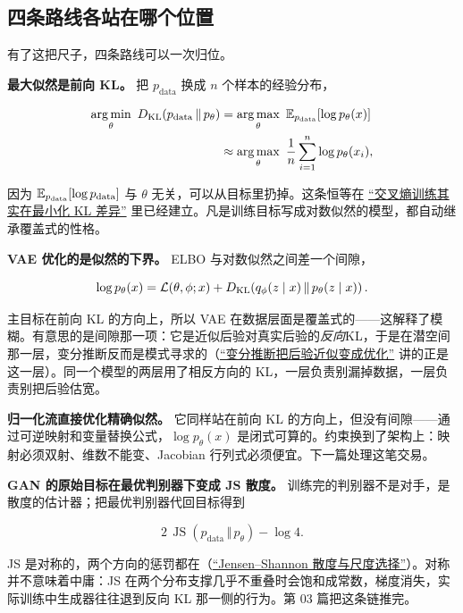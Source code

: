 \subsection{四条路线各站在哪个位置}

有了这把尺子，四条路线可以一次归位。

\textbf{最大似然是前向 KL。} 把 \(p_{\text{data}}\) 换成 \(n\) 个样本的经验分布，

\[
\begin{aligned}
\operatorname*{arg\,min}_\theta\ D_{\mathrm{KL}}(p_{\text{data}}\,\Vert\,p_\theta)
&=\operatorname*{arg\,max}_\theta\ \mathbb{E}_{p_{\text{data}}}\!\left[\log p_\theta(x)\right]\\
&\approx\operatorname*{arg\,max}_\theta\ \frac1n\sum_{i=1}^n\log p_\theta(x_i),
\end{aligned}
\]

因为 \(\mathbb{E}_{p_{\text{data}}}[\log p_{\text{data}}]\) 与 \(\theta\) 无关，可以从目标里扔掉。这条恒等在 \hyperref[sec:13-Machine-Learning/11-Information-Theoretic-Learning/01]{``交叉熵训练其实在最小化 KL 差异''} 里已经建立。凡是训练目标写成对数似然的模型，都自动继承覆盖式的性格。

\textbf{VAE 优化的是似然的下界。} ELBO 与对数似然之间差一个间隙，

\[
\log p_\theta(x)=\mathcal L(\theta,\phi;x)+D_{\mathrm{KL}}\!\left(q_\phi(z\mid x)\,\Vert\,p_\theta(z\mid x)\right).
\]

主目标在前向 KL 的方向上，所以 VAE 在数据层面是覆盖式的——这解释了模糊。有意思的是间隙那一项：它是近似后验对真实后验的\emph{反向}KL，于是在潜空间那一层，变分推断反而是模式寻求的（\hyperref[sec:13-Machine-Learning/08-Sampling-and-Inference/03]{``变分推断把后验近似变成优化''} 讲的正是这一层）。同一个模型的两层用了相反方向的 KL，一层负责别漏掉数据，一层负责别把后验估宽。

\textbf{归一化流直接优化精确似然。} 它同样站在前向 KL 的方向上，但没有间隙——通过可逆映射和变量替换公式，\(\log p_\theta(x)\) 是闭式可算的。约束换到了架构上：映射必须双射、维数不能变、Jacobian 行列式必须便宜。下一篇处理这笔交易。

\textbf{GAN 的原始目标在最优判别器下变成 JS 散度。} 训练完的判别器不是对手，是散度的估计器；把最优判别器代回目标得到

\[
2\,\operatorname{JS}(p_{\text{data}}\,\Vert\,p_\theta)-\log 4 .
\]

JS 是对称的，两个方向的惩罚都在（\hyperref[sec:07-Information-Theory/03-Divergences/03]{``Jensen--Shannon 散度与尺度选择''}）。对称并不意味着中庸：JS 在两个分布支撑几乎不重叠时会饱和成常数，梯度消失，实际训练中生成器往往退到反向 KL 那一侧的行为。第 03 篇把这条链推完。

